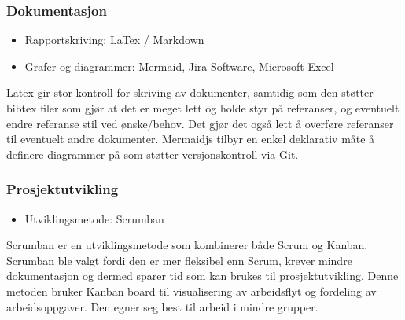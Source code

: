\subsubsection*{Dokumentasjon}

\begin{itemize}
\item Rapportskriving: LaTex / Markdown
\item Grafer og diagrammer: Mermaid, Jira Software, Microsoft Excel
\end{itemize}
Latex gir stor kontroll for skriving av dokumenter, samtidig som den støtter bibtex filer som gjør at det er meget lett og holde styr på referanser, og eventuelt endre referanse stil ved ønske/behov. Det gjør det også lett å overføre referanser til eventuelt andre dokumenter. Mermaidjs tilbyr en enkel deklarativ måte å definere diagrammer på som støtter versjonskontroll via Git.
\subsubsection*{Prosjektutvikling}

\begin{itemize}
    \item Utviklingsmetode: Scrumban
\end{itemize}
Scrumban er en utviklingsmetode som kombinerer både Scrum og Kanban. Scrumban ble valgt fordi den er mer fleksibel enn Scrum, krever mindre dokumentasjon og dermed sparer tid som kan brukes til prosjektutvikling. Denne metoden bruker Kanban board til visualisering av arbeidsflyt og fordeling av arbeidsoppgaver. Den egner seg best til arbeid i mindre grupper.

 

